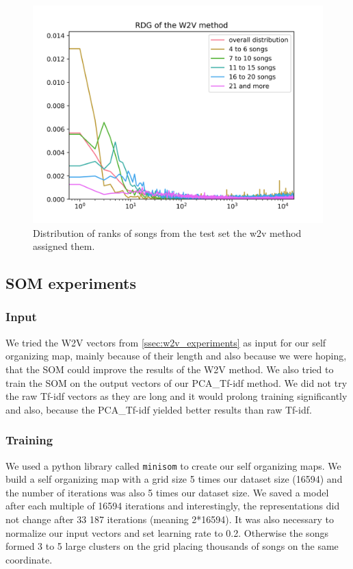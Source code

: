 \begin{figure}[h]
    \centering
	\includegraphics[width=120mm]{./img/w2v_graph.png}
	\caption{Distribution of ranks of songs from the test set the w2v method assigned them.}
	\label{fig:w2v_distribution}
\end{figure}

\subsection{SOM experiments}

\subsubsection{Input}
We tried the W2V vectors from \ref{ssec:w2v_experiments} as input for our self organizing map, mainly because of their length and also because we were hoping, that the SOM could improve the results of the W2V method. We also tried to train the SOM on the output vectors of our PCA\_Tf-idf method. We did not try the raw Tf-idf vectors as they are long and it would prolong training significantly and also, because the PCA\_Tf-idf yielded better results than raw Tf-idf.

\subsubsection{Training}
We used a python library called \texttt{minisom} \cite{Vettigli2019} to create our self organizing maps. We build a self organizing map with a grid size 5 times our dataset size (16594) and the number of iterations was also 5 times our dataset size. We saved a model after each multiple of 16594 iterations and interestingly, the representations did not change after 33 187 iterations (meaning 2*16594). It was also necessary to normalize our input vectors and set learning rate to 0.2. Otherwise the songs formed 3 to 5 large clusters on the grid placing thousands of songs on the same coordinate. 
